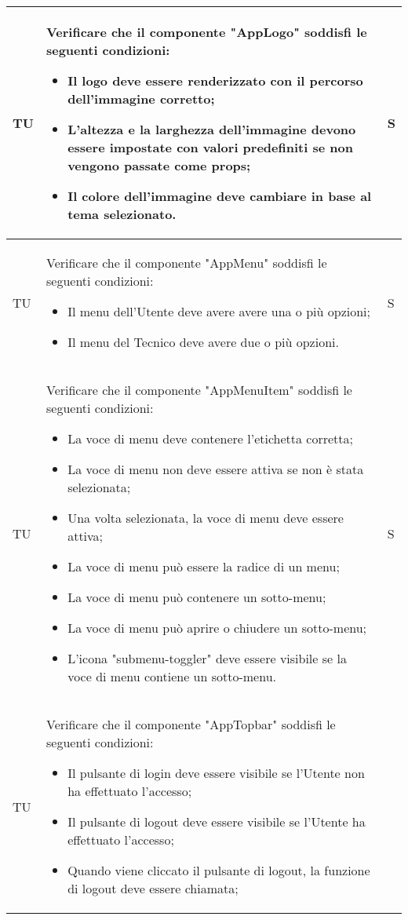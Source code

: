 \begin{adjustwidth}{-0.5cm}{-0.5cm}
\begin{longtable}{|P{1.5cm}|>{\raggedright}P{9.5cm}|>{\arraybackslash}P{1.5cm}|}
		\hline TU & Verificare che il componente "AppLogo" soddisfi le seguenti condizioni:
    \begin{itemize}
      \item Il logo deve essere renderizzato con il percorso dell'immagine corretto;
			\item L'altezza e la larghezza dell'immagine devono essere impostate con valori predefiniti se non vengono passate come props;
			\item Il colore dell'immagine deve cambiare in base al tema selezionato.
    \end{itemize} & S \\
		\hline TU & Verificare che il componente "AppMenu" soddisfi le seguenti condizioni:
    \begin{itemize}
      \item Il menu dell'Utente deve avere avere una o più opzioni;
			\item Il menu del Tecnico deve avere due o più opzioni.
    \end{itemize} & S \\
		\hline TU & Verificare che il componente "AppMenuItem" soddisfi le seguenti condizioni:
    \begin{itemize}
      \item La voce di menu deve contenere l'etichetta corretta;
			\item La voce di menu non deve essere attiva se non è stata selezionata;
			\item Una volta selezionata, la voce di menu deve essere attiva;
			\item La voce di menu può essere la radice di un menu;
			\item La voce di menu può contenere un sotto-menu;
			\item La voce di menu può aprire o chiudere un sotto-menu;
			\item L'icona "submenu-toggler" deve essere visibile se la voce di menu contiene un sotto-menu.
    \end{itemize} & S \\
		\hline TU & Verificare che il componente "AppTopbar" soddisfi le seguenti condizioni:
    \begin{itemize}
      \item Il pulsante di login deve essere visibile se l'Utente non ha effettuato l'accesso;
			\item Il pulsante di logout deve essere visibile se l'Utente ha effettuato l'accesso;
			\item Quando viene cliccato il pulsante di logout, la funzione di logout deve essere chiamata;

\end{itemize}
\end{longtable}
\end{adjustwidth}

